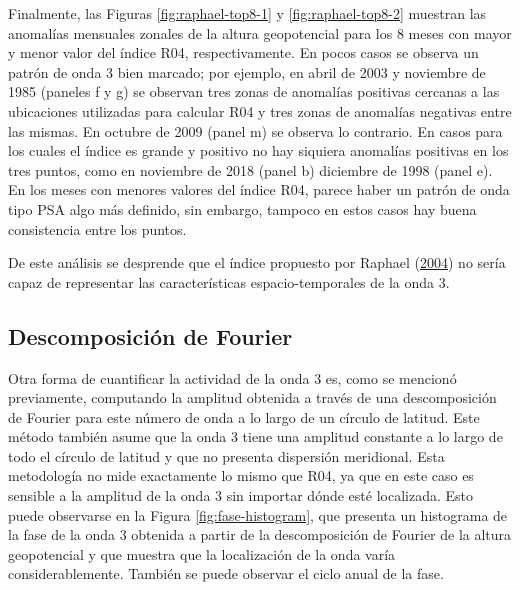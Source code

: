 \documentclass[12pt,oneside,a4paper]{reedthesis}
\begin{document}
Finalmente, las Figuras \ref{fig:raphael-top8-1} y \ref{fig:raphael-top8-2} muestran las anomalías mensuales zonales de la altura geopotencial para los 8 meses con mayor y menor valor del índice R04, respectivamente.
En pocos casos se observa un patrón de onda 3 bien marcado; por ejemplo, en abril de 2003 y noviembre de 1985 (paneles f y g) se observan tres zonas de anomalías positivas cercanas a las ubicaciones utilizadas para calcular R04 y tres zonas de anomalías negativas entre las mismas.
En octubre de 2009 (panel m) se observa lo contrario.
En casos para los cuales el índice es grande y positivo no hay siquiera anomalías positivas en los tres puntos, como en noviembre de 2018 (panel b) diciembre de 1998 (panel e).
En los meses con menores valores del índice R04, parece haber un patrón de onda tipo PSA algo más definido, sin embargo, tampoco en estos casos hay buena consistencia entre los puntos.

De este análisis se desprende que el índice propuesto por Raphael (\protect\hyperlink{ref-raphael2004}{2004}) no sería capaz de representar las características espacio-temporales de la onda 3.

\hypertarget{descomposiciuxf3n-de-fourier}{%
\subsection{Descomposición de Fourier}\label{descomposiciuxf3n-de-fourier}}

Otra forma de cuantificar la actividad de la onda 3 es, como se mencionó previamente, computando la amplitud obtenida a través de una descomposición de Fourier para este número de onda a lo largo de un círculo de latitud.
Este método también asume que la onda 3 tiene una amplitud constante a lo largo de todo el círculo de latitud y que no presenta dispersión meridional.
Esta metodología no mide exactamente lo mismo que R04, ya que en este caso es sensible a la amplitud de la onda 3 sin importar dónde esté localizada.
Esto puede observarse en la Figura \ref{fig:fase-histogram}, que presenta un histograma de la fase de la onda 3 obtenida a partir de la descomposición de Fourier de la altura geopotencial y que muestra que la localización de la onda varía considerablemente.
También se puede observar el ciclo anual de la fase.
\end{document}
